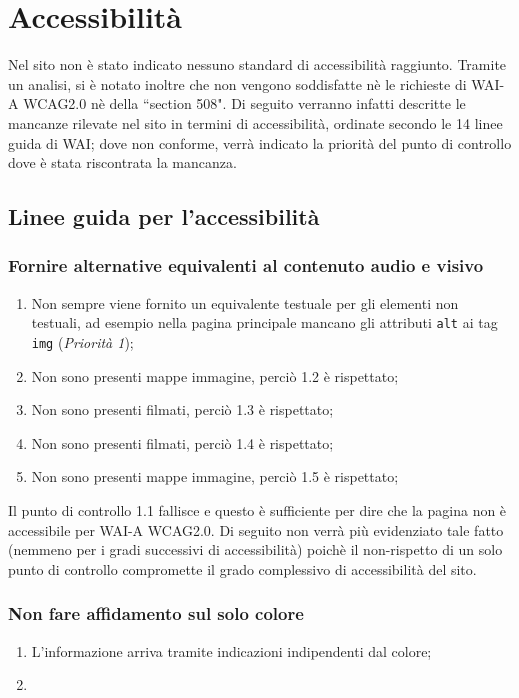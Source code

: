 \section{Accessibilità}
Nel sito non è stato indicato nessuno standard di accessibilità raggiunto.
Tramite un analisi, si è notato inoltre che non vengono soddisfatte nè le
richieste di WAI-A WCAG2.0 nè della ``section 508".
Di seguito verranno infatti descritte le mancanze rilevate nel sito in termini
di accessibilità, ordinate secondo le 14 linee guida di WAI; dove non conforme,
verrà indicato la priorità del punto di controllo dove è stata riscontrata la
mancanza.

\subsection{Linee guida per l'accessibilità}

\subsubsection{Fornire alternative equivalenti al contenuto audio e visivo}
\begin{enumerate}
\item Non sempre viene fornito un equivalente testuale per gli elementi non
testuali, ad esempio nella pagina principale mancano gli attributi \texttt{alt}
ai tag \texttt{img}
(\textit{Priorità 1});
\item Non sono presenti mappe immagine, perciò 1.2 è rispettato;
\item Non sono presenti filmati, perciò 1.3 è rispettato;
\item Non sono presenti filmati, perciò 1.4 è rispettato;
\item Non sono presenti mappe immagine, perciò 1.5 è rispettato;
\end{enumerate}

Il punto di controllo 1.1 fallisce e questo è sufficiente per dire che la
pagina non è accessibile per WAI-A WCAG2.0. Di seguito non verrà più
evidenziato tale fatto (nemmeno per i gradi successivi di accessibilità) poichè
il non-rispetto di un solo punto di controllo compromette il grado complessivo
di accessibilità del sito.

\subsubsection{Non fare affidamento sul solo colore}
\begin{enumerate}
\item L'informazione arriva tramite indicazioni indipendenti dal colore;
\item %
\end{enumerate}

